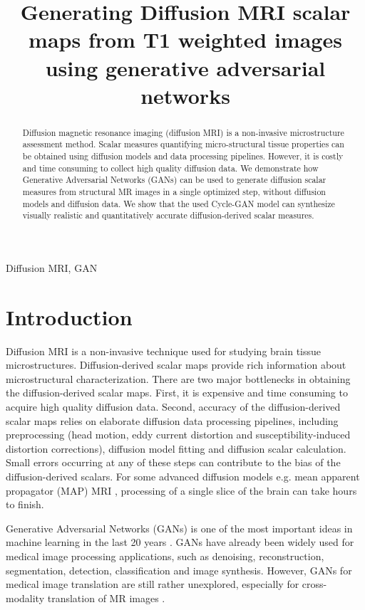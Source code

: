 \documentclass{article}
\title{Generating Diffusion MRI scalar maps from T1 weighted images using generative adversarial networks}
\begin{document}
%
\maketitle
%
\begin{abstract}
  Diffusion magnetic resonance imaging (diffusion MRI) is a non-invasive microstructure assessment method. Scalar measures quantifying micro-structural tissue properties can be obtained using diffusion models and data processing pipelines. However, it is costly and time consuming to collect high quality  diffusion data. We demonstrate how Generative Adversarial Networks (GANs) can be used to generate diffusion scalar measures from  structural MR images in a single optimized step, without diffusion models and diffusion data. We show that the used Cycle-GAN model can synthesize visually realistic and quantitatively accurate diffusion-derived scalar measures.
\end{abstract}
%
\begin{keywords}
Diffusion MRI, GAN
\end{keywords}
%
\section{Introduction}
\label{sec:intro}

Diffusion MRI is a non-invasive technique used for studying brain tissue microstructures. Diffusion-derived scalar maps provide rich information about microstructural characterization. There are two major bottlenecks in obtaining the diffusion-derived scalar maps. First, it is expensive and time consuming to acquire high quality diffusion data. Second, accuracy of the diffusion-derived scalar maps relies on elaborate diffusion data processing pipelines, including preprocessing (head motion, eddy current distortion and susceptibility-induced distortion corrections), diffusion model fitting and diffusion scalar calculation. Small errors occurring at any of these steps can contribute to the bias of the diffusion-derived scalars. For some advanced diffusion models e.g. mean apparent propagator (MAP) MRI \cite{ozarslan2013mean}, processing of a single slice of the brain can take hours to finish.

Generative Adversarial Networks (GANs) is one of the most important ideas in machine learning in the last 20 years \cite{goodfellow2014generative}. GANs have already been widely used for medical image processing applications, such as denoising, reconstruction, segmentation, detection, classification and image synthesis. However, GANs for medical image translation are still rather unexplored, especially for cross-modality translation of MR images \cite{kazeminia2018gans}.
\end{document}
